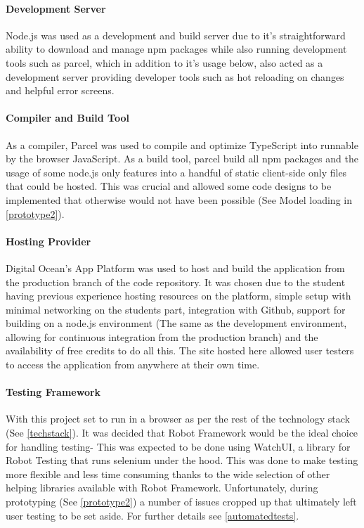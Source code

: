 \paragraph{Development Server}
Node.js was used as a development and build server due to it's straightforward ability to download and manage npm packages while also running development tools such as parcel, which in addition to it's usage below, also acted as a development server providing developer tools such as hot reloading on changes and helpful error screens.

\paragraph{Compiler and Build Tool}
As a compiler, Parcel was used to compile and optimize TypeScript into runnable by the browser JavaScript. As a build tool, parcel build all npm packages and the usage of some node.js only features into a handful of static client-side only files that could be hosted. This was crucial and allowed some code designs to be implemented that otherwise would not have been possible (See Model loading in \ref{prototype2}).

\paragraph{Hosting Provider}
Digital Ocean's App Platform was used to host and build the application from the production branch of the code repository. It was chosen due to the student having previous experience hosting resources on the platform, simple setup with minimal networking on the students part, integration with Github, support for building on a node.js environment (The same as the development environment, allowing for continuous integration from the production branch) and the availability of free credits to do all this. The site hosted here allowed user testers to access the application from anywhere at their own time.

\paragraph{Testing Framework} \label{testframe}
With this project set to run in a browser as per the rest of the technology stack (See \ref{techstack}). It was decided that Robot Framework would be the ideal choice for handling testing- This was expected to be done using WatchUI, a library for Robot Testing that runs selenium under the hood. This was done to make testing more flexible and less time consuming thanks to the wide selection of other helping libraries available with Robot Framework. Unfortunately, during prototyping (See \ref{prototype2}) a number of issues cropped up that ultimately left user testing to be set aside. For further details see \ref{automatedtests}.


